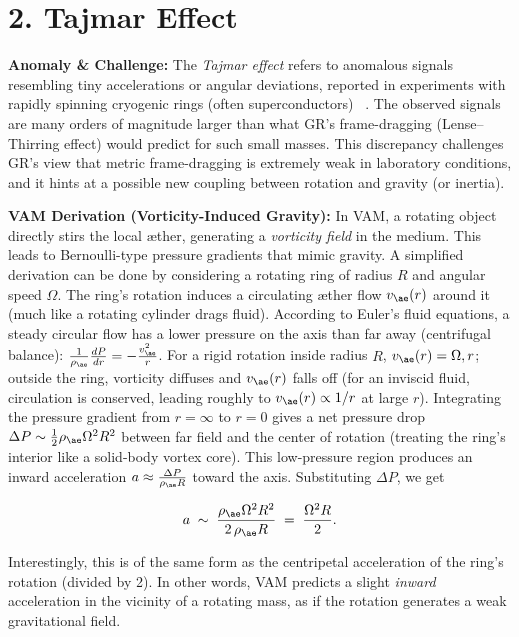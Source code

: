 \documentclass[a4paper, aps,preprint,superscriptaddress, 12pt]{revtex4}
\begin{document}
\section*{2. Tajmar Effect}

\textbf{Anomaly \& Challenge: } The \textit{Tajmar effect} refers to anomalous signals resembling tiny accelerations or angular deviations, reported in experiments with rapidly spinning cryogenic rings (often superconductors)~\cite{Iskandarani2025b} . The observed signals are many orders of magnitude larger than what GR’s frame-dragging (Lense–Thirring effect) would predict for such small masses. This discrepancy challenges GR’s view that metric frame-dragging is extremely weak in laboratory conditions, and it hints at a possible new coupling between rotation and gravity (or inertia).


\textbf{VAM Derivation (Vorticity-Induced Gravity):} In VAM, a rotating object directly stirs the local æther, generating a \textit{vorticity field} in the medium. This leads to Bernoulli-type pressure gradients that mimic gravity. A simplified derivation can be done by considering a rotating ring of radius $R$ and angular speed $\Omega$. The ring’s rotation induces a circulating æther flow $v_{\ae}(r)$ around it (much like a rotating cylinder drags fluid). According to Euler’s fluid equations, a steady circular flow has a lower pressure on the axis than far away (centrifugal balance): $\frac{1}{\rho_{\ae}}\frac{dP}{dr} = -\frac{v_{\ae}^2}{r}$. For a rigid rotation inside radius $R$, $v_{\ae}(r)=\Omega,r$; outside the ring, vorticity diffuses and $v_{\ae}(r)$ falls off (for an inviscid fluid, circulation is conserved, leading roughly to $v_{\ae}(r)\propto 1/r$ at large $r$). Integrating the pressure gradient from $r=\infty$ to $r=0$ gives a net pressure drop $\Delta P \sim \frac{1}{2}\rho_{\ae}\Omega^2 R^2$ between far field and the center of rotation (treating the ring’s interior like a solid-body vortex core). This low-pressure region produces an inward acceleration $a \approx \frac{\Delta P}{\rho_{\ae}R}$ toward the axis. Substituting $\Delta P$, we get

\begin{equation}
    a \;\sim\; \frac{\rho_{\ae}\Omega^2 R^2}{2\,\rho_{\ae}R} \;=\; \frac{\Omega^2 R}{2}.
\end{equation}

Interestingly, this is of the same form as the centripetal acceleration of the ring’s rotation (divided by 2). In other words, VAM predicts a slight \textit{inward} acceleration in the vicinity of a rotating mass, as if the rotation generates a weak gravitational field.
\end{document}
